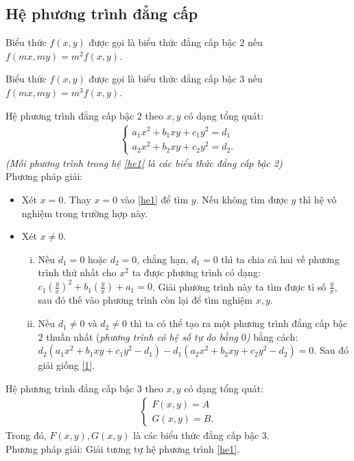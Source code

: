 \subsection{Hệ phương trình đẳng cấp}
\begin{dn}
	Biểu thức $ f(x,y) $ được gọi là biểu thức đẳng cấp bậc $ 2 $ nếu $ f(mx,my)=m^2f(x,y) $.
\end{dn}
\begin{dn}
	Biểu thức $ f(x,y) $ được gọi là biểu thức đẳng cấp bậc $ 3 $ nếu $ f(mx,my)=m^3f(x,y) $.
\end{dn}
\begin{dn}
	Hệ phương trình đẳng cấp bậc $ 2 $ theo $ x,y $ có dạng tổng quát:
\begin{align}\label{he1}
	\begin{cases}
		a_1x^2+b_1xy+c_1y^2=d_1 \\
		a_2x^2+b_2xy+c_2y^2=d_2.
	\end{cases}
\end{align}
\textit{(Mỗi phương trình trong hệ \eqref{he1} là các biểu thức đẳng cấp bậc 2)}\\
Phương pháp giải:
\begin{itemize}
	\item Xét $ x=0 $. Thay $ x=0 $ vào \eqref{he1} để tìm $ y $. Nếu không tìm được $ y $ thì hệ vô nghiệm trong trường hợp này.
	\item Xét $ x\neq0 $.
	\begin{enumerate}[(i)]
		\item \label{1} Nếu $ d_1=0 $ hoặc $ d_2=0 $, chẳng hạn, $ d_1=0 $ thì ta chia cả hai vế phương trình thứ nhất cho $ x^2 $ ta được phương trình có dạng: 	$ c_1(\frac{y}{x})^2+b_1(\frac{y}{x})+a_1 =0 $. Giải phương trình này ta tìm được  tỉ số $ \frac{y}{x} $, sau đó thế vào phương trình còn lại để tìm nghiệm $ x,y $.
		\item Nếu $ d_1\neq0 $ và $ d_2\neq0 $ thì ta có thể tạo ra một phương trình đẳng cấp bậc $ 2 $ thuần nhất (\textit{phương trình có hệ số tự do bằng $ 0 $)} bằng cách:
		\\$d_2( a_1x^2+b_1xy+c_1y^2-d_1)-
		d_1(a_2x^2+b_2xy+c_2y^2 -d_2)=0 $. Sau đó giải giống \eqref{1}.
	\end{enumerate}
\end{itemize}
\end{dn}
\begin{dn}
	Hệ phương trình đẳng cấp bậc $ 3 $ theo $ x,y $ có dạng tổng quát:
	\begin{align}\label{he2}
	\begin{cases}
	F(x,y)=A \\
	G(x,y)=B.
	\end{cases}
	\end{align}
	Trong đó, $ F(x,y), G(x,y) $ là các biểu thức đẳng cấp bậc $ 3 $.\\
Phương pháp giải: Giải tương tự hệ phương trình \eqref{he1}.
\end{dn}
